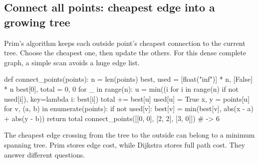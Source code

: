 \documentclass[11pt]{article}
\begin{document}
\subsection{Connect all points: cheapest edge into a growing tree}
Prim's algorithm keeps each outside point's cheapest connection to the current tree.
Choose the cheapest one, then update the others. For this dense complete graph, a simple scan avoids a huge edge list.
\par\noindent\begin{minipage}{\linewidth}
\hypertarget{example-start-46}{}
\begin{pyex}
def connect_points(points):
    n = len(points)
    best, used = [float("inf")] * n, [False] * n
    best[0], total = 0, 0
    for _ in range(n):
        u = min((i for i in range(n) if not used[i]), key=lambda i: best[i])
        total += best[u]
        used[u] = True
        x, y = points[u]
        for v, (a, b) in enumerate(points):
            if not used[v]:
                best[v] = min(best[v], abs(x - a) + abs(y - b))
    return total
connect_points([[0, 0], [2, 2], [3, 0]]) # -> 6
\end{pyex}
\hypertarget{example-end-46}{}
\end{minipage}\par
The cheapest edge crossing from the tree to the outside can belong to a minimum spanning tree.
Prim stores edge cost, while Dijkstra stores full path cost. They answer different questions.
\end{document}
